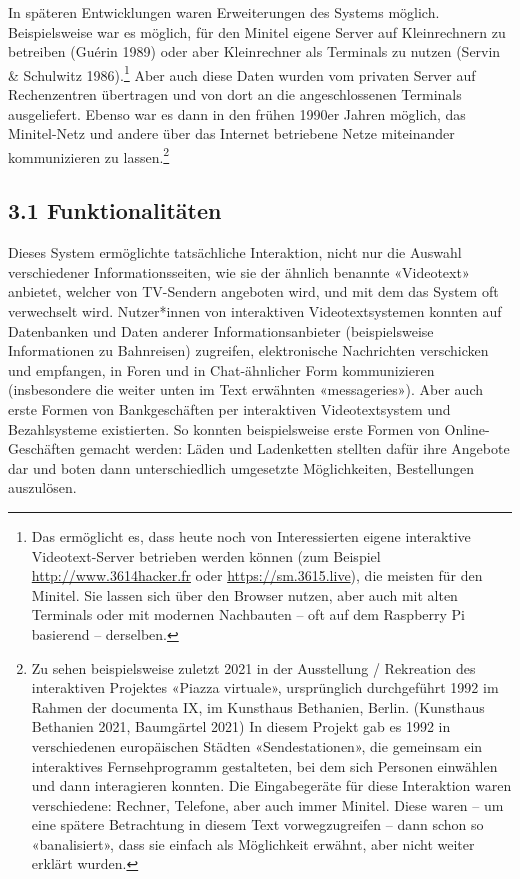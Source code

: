\documentclass[a4paper,
fontsize=11pt,
oneside,
numbers=noperiodatend,
parskip=half-,
bibliography=totoc,
final
]{scrartcl}
\begin{document}
In späteren Entwicklungen waren Erweiterungen des Systems möglich.
Beispielsweise war es möglich, für den Minitel eigene Server auf
Kleinrechnern zu betreiben (Guérin 1989) oder aber Kleinrechner als
Terminals zu nutzen (Servin \& Schulwitz 1986).\footnote{Das ermöglicht
  es, dass heute noch von Interessierten eigene interaktive
  Videotext-Server betrieben werden können (zum Beispiel
  \href{http://www.3614hacker.fr/}{http://www.3614hacker.fr} oder
  \href{https://sm.3615.live/}{https://sm.3615.live}), die meisten für
  den Minitel. Sie lassen sich über den Browser nutzen, aber auch mit
  alten Terminals oder mit modernen Nachbauten -- oft auf dem Raspberry
  Pi basierend -- derselben.} Aber auch diese Daten wurden vom privaten
Server auf Rechenzentren übertragen und von dort an die angeschlossenen
Terminals ausgeliefert. Ebenso war es dann in den frühen 1990er Jahren
möglich, das Minitel-Netz und andere über das Internet betriebene Netze
miteinander kommunizieren zu lassen.\footnote{Zu sehen beispielsweise
  zuletzt 2021 in der Ausstellung / Rekreation des interaktiven
  Projektes «Piazza virtuale», ursprünglich durchgeführt 1992 im Rahmen
  der documenta IX, im Kunsthaus Bethanien, Berlin. (Kunsthaus Bethanien
  2021, Baumgärtel 2021) In diesem Projekt gab es 1992 in verschiedenen
  europäischen Städten «Sendestationen», die gemeinsam ein interaktives
  Fernsehprogramm gestalteten, bei dem sich Personen einwählen und dann
  interagieren konnten. Die Eingabegeräte für diese Interaktion waren
  verschiedene: Rechner, Telefone, aber auch immer Minitel. Diese waren
  -- um eine spätere Betrachtung in diesem Text vorwegzugreifen -- dann
  schon so «banalisiert», dass sie einfach als Möglichkeit erwähnt, aber
  nicht weiter erklärt wurden.}

\hypertarget{funktionalituxe4ten}{%
\subsection{3.1 Funktionalitäten}\label{funktionalituxe4ten}}

Dieses System ermöglichte tatsächliche Interaktion, nicht nur die
Auswahl verschiedener Informationsseiten, wie sie der ähnlich benannte
«Videotext» anbietet, welcher von TV-Sendern angeboten wird, und mit dem
das System oft verwechselt wird. Nutzer*innen von interaktiven
Videotextsystemen konnten auf Datenbanken und Daten anderer
Informationsanbieter (beispielsweise Informationen zu Bahnreisen)
zugreifen, elektronische Nachrichten verschicken und empfangen, in Foren
und in Chat-ähnlicher Form kommunizieren (insbesondere die weiter unten
im Text erwähnten «messageries»). Aber auch erste Formen von
Bankgeschäften per interaktiven Videotextsystem und Bezahlsysteme
existierten. So konnten beispielsweise erste Formen von
Online-Geschäften gemacht werden: Läden und Ladenketten stellten dafür
ihre Angebote dar und boten dann unterschiedlich umgesetzte
Möglichkeiten, Bestellungen auszulösen.
\end{document}
